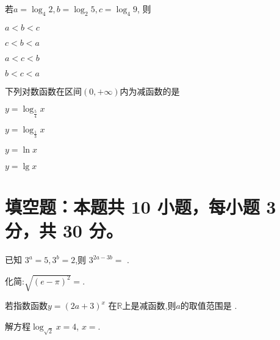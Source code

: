 \documentclass{exam-zh}
\begin{document}
    
\begin{question}
  若$a = \log_4 2 , b = \log_2 5 , c = \log_4 9$, 则 \paren[C]
  \begin{choices}
  \item $a<b<c$
  \item $c<b<a$
  \item $a<c<b$
  \item $b<c<a$
  \end{choices}
\end{question}



\begin{question}
  下列对数函数在区间$(0,+\infty)$内为减函数的是 \paren[B]
  \begin{choices}
  \item $y = \log_{\frac{5}{4}} x$
  \item $y = \log_{\frac{1}{3}} x$
  \item $y = \ln x$
  \item $y = \lg x$
  \end{choices}
\end{question}


\section{填空题：本题共 10 小题，每小题 3 分，共 30 分。}






        \begin{question}
          已知 $3^a = 5,3^b =2$,则 $3^{2a - 3b }  =$ \fillin[$\frac{25}{8}$].
        \end{question}

        \begin{question}
          化简:$\sqrt{(e - \pi)^2}=$\fillin[$\pi - e $].
        \end{question}

        \begin{question}
          若指数函数$y = (2a+3)^x$ 在$\mathbb{R}$上是减函数,则$a$的取值范围是 \fillin[$(-\frac{3}{2},-1)$].
        \end{question}



        \begin{question}
          解方程$\log_{} x = 4$,  $x = $\fillin[$4$].
        \end{question}
\end{document}
